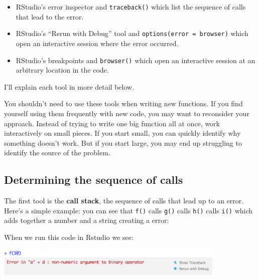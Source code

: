 \begin{itemize}
\item
  RStudio's error inspector and \texttt{traceback()} which list the
  sequence of calls that lead to the error.
\item
  RStudio's ``Rerun with Debug'' tool and
  \texttt{options(error = browser)} which open an interactive session
  where the error occurred.
\item
  RStudio's breakpoints and \texttt{browser()} which open an interactive
  session at an arbitrary location in the code.
\end{itemize}

I'll explain each tool in more detail below.

You shouldn't need to use these tools when writing new functions. If you
find yourself using them frequently with new code, you may want to
reconsider your approach. Instead of trying to write one big function
all at once, work interactively on small pieces. If you start small, you
can quickly identify why something doesn't work. But if you start large,
you may end up struggling to identify the source of the problem.

\subsection{Determining the sequence of calls}

The first tool is the \textbf{call stack}, the sequence of calls that
lead up to an error. Here's a simple example: you can see that
\texttt{f()} calls \texttt{g()} calls \texttt{h()} calls \texttt{i()}
which adds together a number and a string creating a error:
 

\begin{Shaded}
\begin{Highlighting}[]
\StringTok{ }
\StringTok{ }
\StringTok{ }
\StringTok{ } \NormalTok{+}\StringTok{ }
\NormalTok{(}\NormalTok{)}
\end{Highlighting}
\end{Shaded}

When we run this code in Rstudio we see:

\includegraphics[width=4.35in]{screenshots/traceback-hidden.png}

